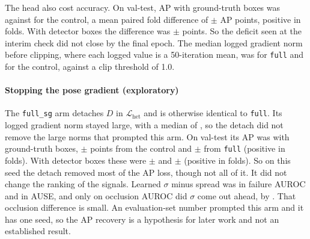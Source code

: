 \documentclass[preprint,11pt]{elsarticle}
\begin{document}
The head also cost accuracy. On val-test, AP with ground-truth boxes was \ApTestGtFtMbvThreeFullSZero{}
against \ApTestGtFtMbvThreeBaseSZero{} for the control, a mean paired fold difference of
\DapGtFtMbvThreeFullSZero{} $\pm$ \DapSdGtFtMbvThreeFullSZero{} AP points, positive in
\DapPosGtFtMbvThreeFullSZero{} folds. With detector boxes the difference was
\DapDetFtMbvThreeFullSZero{} $\pm$ \DapSdDetFtMbvThreeFullSZero{} points. So the deficit seen at the
interim check did not close by the final epoch. The median logged gradient norm before clipping, where
each logged value is a 50-iteration mean, was \GradNormFtMbvThreeFullSZero{} for \texttt{full} and
\GradNormFtMbvThreeBaseSZero{} for the control, against a clip threshold of 1.0.

\begin{table}[t]
\centering\small
\caption{Fine-tuning arms, final-epoch checkpoints. AP is on val-test images. $\Delta$ is the mean
paired difference from the control across 10 disjoint val-test folds, in AP points, with the SD across
folds, for ground-truth (GT) and detector (det.) boxes. $^{\S}$Exploratory arm, added after an interim
look at evaluation data (Section~\ref{sec:arms}).}
\label{tab:ablation}
\end{table}

\paragraph{Stopping the pose gradient (exploratory)} The \texttt{full\_sg} arm detaches $D$ in
$\mathcal{L}_{\text{het}}$ and is otherwise identical to \texttt{full}. Its logged gradient norm stayed
large, with a median of \GradNormFtMbvThreeFullSgSZero{}, so the detach did not remove the large norms that
prompted this arm. On val-test its AP was \ApTestGtFtMbvThreeFullSgSZero{} with
ground-truth boxes, \DapGtFtMbvThreeFullSgSZero{} $\pm$ \DapSdGtFtMbvThreeFullSgSZero{} points from the
control and \DapSgVsFullGt{} $\pm$ \DapSdSgVsFullGt{} from \texttt{full} (positive in
\DapPosSgVsFullGt{} folds). With detector boxes these were \DapDetFtMbvThreeFullSgSZero{} $\pm$
\DapSdDetFtMbvThreeFullSgSZero{} and \DapSgVsFullDet{} $\pm$ \DapSdSgVsFullDet{} (positive in
\DapPosSgVsFullDet{} folds). So on this seed the detach removed most of the AP loss, though not all of
it. It did not change the ranking of the signals. Learned $\sigma$ minus spread was
\DfaFtMbvThreeFullSgSZeroHetMinusDist{} in failure AUROC and \DauseFtMbvThreeFullSgSZeroHetMinusDist{} in
AUSE, and only on occlusion AUROC did $\sigma$ come out ahead, by \DoaFtMbvThreeFullSgSZeroHetMinusDist{}.
That occlusion difference is small. An evaluation-set number prompted this arm and it has one seed, so the
AP recovery is a hypothesis for later work and not an established result.
\end{document}
